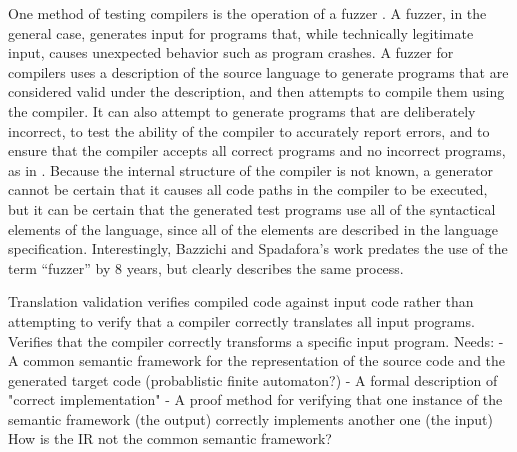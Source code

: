 One method of testing compilers is the operation of a fuzzer \citep{miller1990empirical}. A fuzzer, in the general case, generates input for programs that, while technically legitimate input, causes unexpected behavior such as program crashes. A fuzzer for compilers uses a description of the source language to generate programs that are considered valid under the description, and then attempts to compile them using the compiler. It can also attempt to generate programs that are deliberately incorrect, to test the ability of the compiler to accurately report errors, and to ensure that the compiler accepts all correct programs and no incorrect programs, as in \citep{bazzichi1982automatic}. 
Because the internal structure of the compiler is not known, a generator cannot be certain that it causes all code paths in the compiler to be executed, but it can be certain that the generated test programs use all of the syntactical elements of the language, since all of the elements are described in the language specification. Interestingly, Bazzichi and Spadafora's work predates the use of the term ``fuzzer'' by 8 years, but clearly describes the same process.

Translation validation \citep{pnueli1998translation}
verifies compiled code against input code rather than attempting to verify that a compiler correctly translates all input programs.
Verifies that the compiler correctly transforms a specific input program. 
Needs:
 - A common semantic framework for the representation of the source code and the generated target code (probablistic finite automaton?)
 - A formal description of "correct implementation"
 - A proof method for verifying that one instance of the semantic framework (the output) correctly implements another one (the input)
How is the IR not the common semantic framework?
%
 


